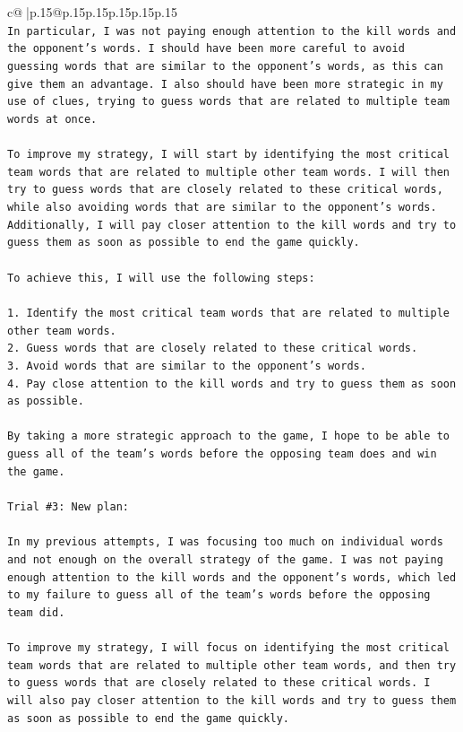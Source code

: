\documentclass{article}
\begin{document}
{\begin{supertabular}{c@{$\;$}|p{.15\linewidth}@{}p{.15\linewidth}p{.15\linewidth}p{.15\linewidth}p{.15\linewidth}p{.15\linewidth}}
{{{\\ 
\texttt{In particular, I was not paying enough attention to the kill words and the opponent's words. I should have been more careful to avoid guessing words that are similar to the opponent's words, as this can give them an advantage. I also should have been more strategic in my use of clues, trying to guess words that are related to multiple team words at once.} \\
\\ 
\texttt{To improve my strategy, I will start by identifying the most critical team words that are related to multiple other team words. I will then try to guess words that are closely related to these critical words, while also avoiding words that are similar to the opponent's words. Additionally, I will pay closer attention to the kill words and try to guess them as soon as possible to end the game quickly.} \\
\\ 
\texttt{To achieve this, I will use the following steps:} \\
\\ 
\texttt{1. Identify the most critical team words that are related to multiple other team words.} \\
\texttt{2. Guess words that are closely related to these critical words.} \\
\texttt{3. Avoid words that are similar to the opponent's words.} \\
\texttt{4. Pay close attention to the kill words and try to guess them as soon as possible.} \\
\\ 
\texttt{By taking a more strategic approach to the game, I hope to be able to guess all of the team's words before the opposing team does and win the game.} \\
\\ 
\texttt{Trial \#3: New plan: } \\
\\ 
\texttt{In my previous attempts, I was focusing too much on individual words and not enough on the overall strategy of the game. I was not paying enough attention to the kill words and the opponent's words, which led to my failure to guess all of the team's words before the opposing team did.} \\
\\ 
\texttt{To improve my strategy, I will focus on identifying the most critical team words that are related to multiple other team words, and then try to guess words that are closely related to these critical words. I will also pay closer attention to the kill words and try to guess them as soon as possible to end the game quickly.} \\
}}}
\end{supertabular}}
\end{document}
